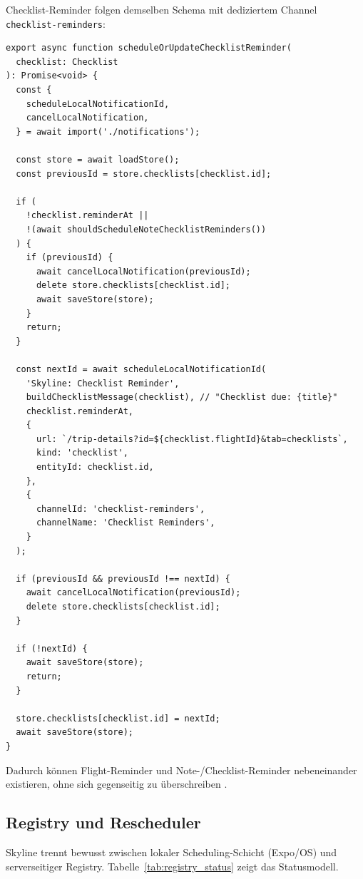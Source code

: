 Checklist-Reminder folgen demselben Schema mit dediziertem Channel
\texttt{checklist-reminders}:

\begin{lstlisting}[style=skyline-ts,
  caption={Vollstaendiges scheduleOrUpdateChecklistReminder
           (services/noteChecklistReminderService.ts)},
  label={lst:checklist_reminder}]
export async function scheduleOrUpdateChecklistReminder(
  checklist: Checklist
): Promise<void> {
  const {
    scheduleLocalNotificationId,
    cancelLocalNotification,
  } = await import('./notifications');

  const store = await loadStore();
  const previousId = store.checklists[checklist.id];

  if (
    !checklist.reminderAt ||
    !(await shouldScheduleNoteChecklistReminders())
  ) {
    if (previousId) {
      await cancelLocalNotification(previousId);
      delete store.checklists[checklist.id];
      await saveStore(store);
    }
    return;
  }

  const nextId = await scheduleLocalNotificationId(
    'Skyline: Checklist Reminder',
    buildChecklistMessage(checklist), // "Checklist due: {title}"
    checklist.reminderAt,
    {
      url: `/trip-details?id=${checklist.flightId}&tab=checklists`,
      kind: 'checklist',
      entityId: checklist.id,
    },
    {
      channelId: 'checklist-reminders',
      channelName: 'Checklist Reminders',
    }
  );

  if (previousId && previousId !== nextId) {
    await cancelLocalNotification(previousId);
    delete store.checklists[checklist.id];
  }

  if (!nextId) {
    await saveStore(store);
    return;
  }

  store.checklists[checklist.id] = nextId;
  await saveStore(store);
}
\end{lstlisting}

Dadurch können Flight-Reminder und Note-/Checklist-Reminder nebeneinander existieren,
ohne sich gegenseitig zu überschreiben \cite{expoNotificationsSDK}.

\subsection{Registry und Rescheduler}
\label{subsec:registry-rescheduler}

Skyline trennt bewusst zwischen lokaler Scheduling-Schicht (Expo/OS) und
serverseitiger Registry.
Tabelle~\ref{tab:registry_status} zeigt das Statusmodell.

